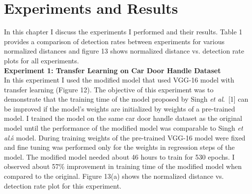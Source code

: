\documentclass [11pt,letterpaper ,twoside ,openany ]{report}
\begin{document}
    \chapter{Experiments and Results}
    \doublespacing

    In this chapter I discuss the experiments I performed and their results. Table 1 provides a comparison of detection rates between experiments for various normalized distances and figure 13 shows normalized distance vs. detection rate plots for all experiments.\\

    \noindent
    \textbf{Experiment 1: Transfer Learning on Car Door Handle Dataset}\\    
    In this experiment I used the modified model that used VGG-16 model with transfer learning (Figure 12). The objective of this experiment was to demonstrate that the training time of the model proposed by Singh \textit{et al}.\ [1] can be improved if the model's weights are initialized by weights of a pre-trained model. I trained the model on the same car door handle dataset as the original model until the performance of the modified model was comparable to Singh \textit{et al}.\'s model. During training weights of the pre-trained VGG-16 model were fixed and fine tuning was performed only for the weights in regression steps of the model. The modified model needed about 46 hours to train for 530 epochs. I observed about 57\% improvement in training time of the modified model when compared to the original. Figure 13(a) shows the normalized distance vs. detection rate plot for this experiment.
\end{document}

